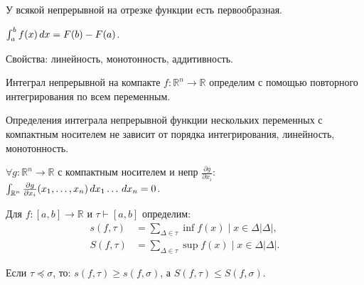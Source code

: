 
\begin{to_thr}
	У всякой непрерывной на отрезке функции есть первообразная.
	\label{4.88}
\end{to_thr}

\begin{to_def}
	$\int_a^b f(x) \, d x = F(b) - F(a)$.

	Свойства: линейность, монотонность, аддитивность.
	\label{4.89}
\end{to_def}

\begin{to_def}
	Интеграл непрерывной на компакте $f \colon \mathbb{R}^n \to \mathbb{R}$ определим с помощью повторного интегрирования по всем переменным.
\end{to_def}

\begin{to_thr}
	Определения интеграла непрерывной функции нескольких переменных с компактным носителем не зависит от порядка интегрирования, линейность, монотонность.
	\label{4.92}
\end{to_thr}

\begin{to_con}
	$\forall g \colon \mathbb{R}^n \to \mathbb{R}$ с компактным носителем и непр $\frac{\partial g}{\partial x_i}$: $\int_{\mathbb{R}^n} \frac{\partial g}{\partial x_i}(x_1, \dots, x_n) \, d x_1 \dots \, d x_n = 0$.
\end{to_con}




\begin{to_def}
	Для $f \colon [a,b] \to \mathbb{R}$ и $\tau \vdash [a,b]$ определим:
	\begin{equation*}
	\begin{split}
		s(f,\tau) &= \sum\limits_{\Delta \in \tau} \inf {f(x) \mid x \in \Delta} |\Delta|, \\
		S(f,\tau) &= \sum\limits_{\Delta \in \tau} \sup {f(x) \mid x \in \Delta} |\Delta|.
	\end{split}
	\end{equation*}
\end{to_def}

\begin{to_lem}
	Если $\tau \preccurlyeq \sigma$, то: $s(f,\tau) \geq s(f,\sigma)$, а $S(f,\tau) \leq S(f,\sigma)$.
	\label{4.97}
\end{to_lem}

